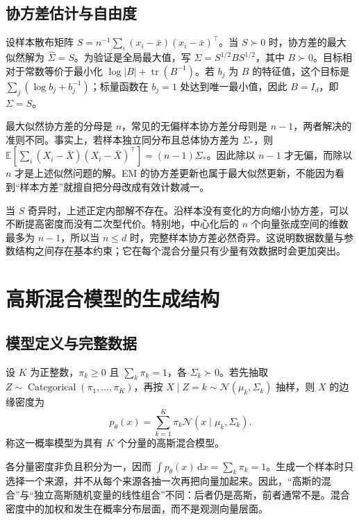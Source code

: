 \documentclass[UTF8,12pt,a4paper,fontset=fandol]{ctexart}
\begin{document}
\subsection{协方差估计与自由度}
设样本散布矩阵 $S=n^{-1}\sum_i(x_i-\bar x)(x_i-\bar x)^\top$。当 $S\succ0$ 时，协方差的最大似然解为 $\widehat\Sigma=S$。为验证是全局最大值，写 $\Sigma=S^{1/2}BS^{1/2}$，其中 $B\succ0$。目标相对于常数等价于最小化 $\log|B|+\operatorname{tr}(B^{-1})$。若 $b_j$ 为 $B$ 的特征值，这个目标是 $\sum_j(\log b_j+b_j^{-1})$；标量函数在 $b_j=1$ 处达到唯一最小值，因此 $B=I_d$，即 $\Sigma=S$。

最大似然协方差的分母是 $n$，常见的无偏样本协方差分母则是 $n-1$，两者解决的准则不同。事实上，若样本独立同分布且总体协方差为 $\Sigma_*$，则 $\mathbb E[\sum_i(X_i-\bar X)(X_i-\bar X)^\top]=(n-1)\Sigma_*$。因此除以 $n-1$ 才无偏，而除以 $n$ 才是上述似然问题的解。EM 的协方差更新也属于最大似然更新，不能因为看到“样本方差”就擅自把分母改成有效计数减一。

当 $S$ 奇异时，上述正定内部解不存在。沿样本没有变化的方向缩小协方差，可以不断提高密度而没有二次型代价。特别地，中心化后的 $n$ 个向量张成空间的维数最多为 $n-1$，所以当 $n\leq d$ 时，完整样本协方差必然奇异。这说明数据数量与参数结构之间存在基本约束；它在每个混合分量只有少量有效数据时会更加突出。

\section{高斯混合模型的生成结构}
\label{sec:gmm-model}

\subsection{模型定义与完整数据}
\begin{definition}[有限高斯混合模型]
设 $K$ 为正整数，$\pi_k\geq0$ 且 $\sum_k\pi_k=1$，各 $\Sigma_k\succ0$。若先抽取 $Z\sim\operatorname{Categorical}(\pi_1,\ldots,\pi_K)$，再按 $X\mid Z=k\sim\mathcal N(\mu_k,\Sigma_k)$ 抽样，则 $X$ 的边缘密度为
\begin{equation}
p_\theta(x)=\sum_{k=1}^K\pi_k\mathcal N(x\mid\mu_k,\Sigma_k).
\label{eq:gmm-mixture-density}
\end{equation}
称这一概率模型为具有 $K$ 个分量的高斯混合模型。
\end{definition}

各分量密度非负且积分为一，因而 $\int p_\theta(x)\,\mathrm dx=\sum_k\pi_k=1$。生成一个样本时只选择一个来源，并不从每个来源各抽一次再把向量加起来。因此，“高斯的混合”与“独立高斯随机变量的线性组合”不同：后者仍是高斯，前者通常不是。混合密度中的加权和发生在概率分布层面，而不是观测向量层面。
\end{document}
